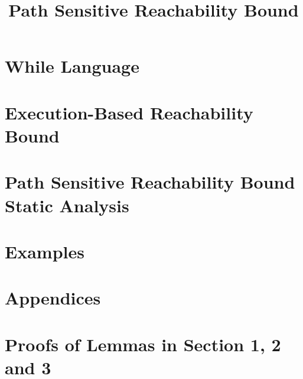 \documentclass[a4paper,11pt]{article}
\newcommand{\highlight}[1]{\textcolor[rgb]{.0,0.0,1.0}{ #1}}
\begin{document}
\title{Path Sensitive Reachability Bound}

\author{}

\date{}

\maketitle
%
\tableofcontents

% 
\section{{While Language}}
\label{sec:language}

\clearpage
\section{\highlight{Execution-Based Reachability Bound}}
\label{sec:execution_rb}

\section{Path Sensitive Reachability Bound Static Analysis}
\label{sec:static_pathsensitiverb}


\section{Examples}
\label{sec:example}





% 


%
% 
%
\clearpage
\appendix
{}
\section*{Appendices}
\section{Proofs of Lemmas in Section 1, 2 and 3}
\label{apdx:lemma_sec123}

\clearpage
% 
\clearpage
\end{document}
